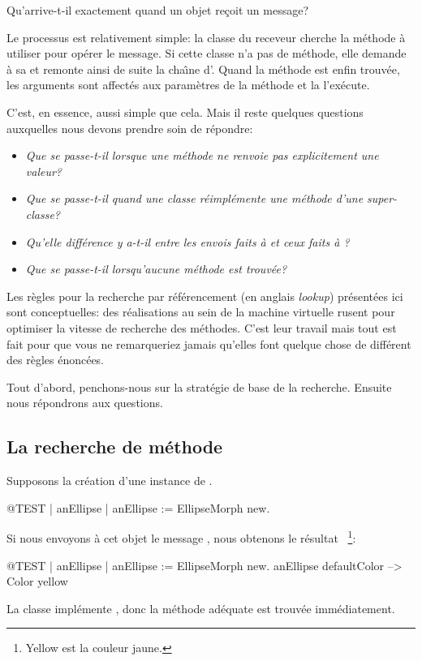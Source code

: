 \documentclass[a4paper,10pt,twoside]{book}
\begin{document}

Qu'arrive-t-il exactement quand un objet re\c{c}oit un message?

Le processus est relativement simple:
la classe du receveur cherche la m\'ethode \`a utiliser pour
op\'erer le message.
Si cette classe n'a pas de m\'ethode, elle demande \`a sa  et remonte ainsi de suite la cha\^{\i}ne d'.
Quand la m\'ethode est enfin trouv\'ee, les arguments sont affect\'es aux param\`etres de la m\'ethode et la  l'ex\'ecute.

C'est, en essence, aussi simple que cela.
Mais il reste quelques questions auxquelles nous devons prendre soin de r\'epondre:

\begin{itemize}
  \item \emph{Que se passe-t-il lorsque une m\'ethode ne renvoie pas explicitement une valeur?}
  \item \emph{Que se passe-t-il quand une classe r\'eimpl\'emente une m\'ethode d'une super-classe?}
  \item \emph{Qu'elle diff\'erence y a-t-il entre les envois faits \`a  et ceux faits \`a ?}
  \item \emph{Que se passe-t-il lorsqu'aucune m\'ethode est trouv\'ee?}
\end{itemize}

Les r\`egles pour la recherche par r\'ef\'erencement (en anglais \emph{lookup}) pr\'esent\'ees ici sont conceptuelles: des r\'ealisations au sein de la machine virtuelle rusent pour optimiser la vitesse de recherche des m\'ethodes. 
C'est leur travail mais tout est fait pour que vous ne remarqueriez jamais qu'elles font quelque chose de diff\'erent des r\`egles \'enonc\'ees.

Tout d'abord, penchons-nous sur la strat\'egie de base de la recherche. Ensuite
nous r\'epondrons aux questions.

\subsection{La recherche de m\'ethode}
Supposons la cr\'eation d'une instance de .
\begin{code}{@TEST | anEllipse |}
anEllipse := EllipseMorph new.
\end{code}
\noindent
Si nous envoyons \`a cet objet le message , nous obtenons le r\'esultat ~\footnote{Yellow est la couleur jaune.}:
\begin{code}{@TEST | anEllipse | anEllipse := EllipseMorph new.}
anEllipse defaultColor --> Color yellow
\end{code}
\noindent
La classe  impl\'emente , donc la m\'ethode ad\'equate est trouv\'ee imm\'ediatement.
\end{document}
